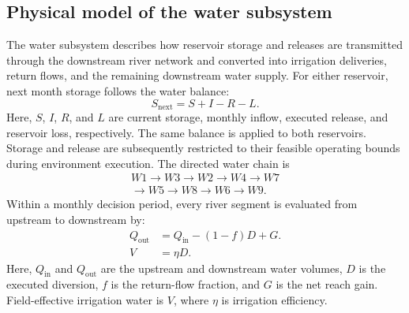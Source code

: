 \documentclass [a4paper,fleqn] {cas-dc}
\begin{document}
\subsection{Physical model of the water subsystem} \label{sec22}
The water subsystem describes how reservoir storage and releases are transmitted through the downstream river network and converted into irrigation deliveries, return flows, and the remaining downstream water supply. For either reservoir, next month storage follows the water balance: 
\begin{equation}
  S_{\mathrm{next}}=S+I-R-L.
  \label{eq:reservoir-balance}
\end{equation}
Here, $S$, $I$, $R$, and $L$ are current storage, monthly inflow, executed release, and reservoir loss, respectively. The same balance is applied to both reservoirs. Storage and release are subsequently restricted to their feasible operating bounds during environment execution. The directed water chain is
\[
\begin{gathered}
  W1\rightarrow W3\rightarrow W2\rightarrow W4\rightarrow W7\\[-2pt]
  {}\rightarrow W5\rightarrow W8\rightarrow W6\rightarrow W9.
\end{gathered}
\]
Within a monthly decision period, every river segment is evaluated from upstream to downstream by:
\begin{align}
  Q_{\mathrm{out}}&=Q_{\mathrm{in}}-(1-f)D+G.
  \label{eq:reach-transfer}\\
  V&=\eta D.
  \label{eq:field-effective-water}
\end{align}
Here, $Q_{\mathrm{in}}$ and $Q_{\mathrm{out}}$ are the upstream and downstream water volumes, $D$ is the executed diversion, $f$ is the return-flow fraction, and $G$ is the net reach gain. Field-effective irrigation water is $V$, where $\eta$ is irrigation efficiency.

\end{document}
